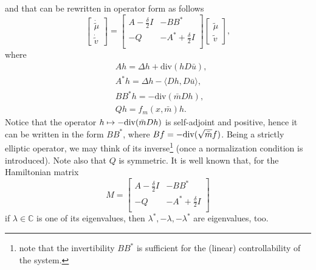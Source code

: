\documentclass[10pt,a4paper,nouppercase,nowrite]{article}
\numberwithin{equation}{section}
\theoremstyle{definition}
\begin{document}
	and that can be rewritten in operator form as follows
	\begin{equation*}
		\begin{bmatrix}
			\dot{\tilde{\mu}} \\
			\dot{\tilde{v}}	
		\end{bmatrix}
		=
		\begin{bmatrix}
			A-\frac{\delta}{2} I & -BB^{*} \\
			-Q & -A^{*} + \frac{\delta}{2} I \\
		\end{bmatrix}
		\begin{bmatrix}
			\tilde{\mu} \\
			\tilde{v}
		\end{bmatrix}
		,
	\end{equation*}
	where
	\begin{align*}
		& A h = \Delta h + \text{div}(h D\bar{u}),\\
		& A^{*} h = \Delta h - \langle Dh,D\bar{u} \rangle,\\
		& BB^{*} h = -\text{div}(\bar{m}Dh),\\
		& Qh = f_m(x,\bar{m}) h.
	\end{align*}
	Notice that the operator $h \mapsto -{\rm div}(\bar{m}Dh)$ is self-adjoint and positive, hence it can be written in the form $BB^{*}$, where $Bf = -{\rm div}(\sqrt{\bar m}f)$. Being a strictly elliptic operator, we may think of its inverse\footnote{note that the invertibility $BB^*$ is sufficient for the (linear) controllability of the system.} (once a normalization condition is introduced). Note also that $Q$ is symmetric. It is well known that, for the Hamiltonian matrix 
	\begin{equation*}
		M=
		\begin{bmatrix}
			A-\frac{\delta}{2} I & -BB^{*} \\
			-Q & -A^{*} + \frac{\delta}{2} I \\
		\end{bmatrix}
	\end{equation*}
	if $\lambda \in \mathbb{C}$ is one of its eigenvalues, then $\lambda^{*}, - \lambda, -\lambda^{*}$ are eigenvalues, too.
	
\end{document}
